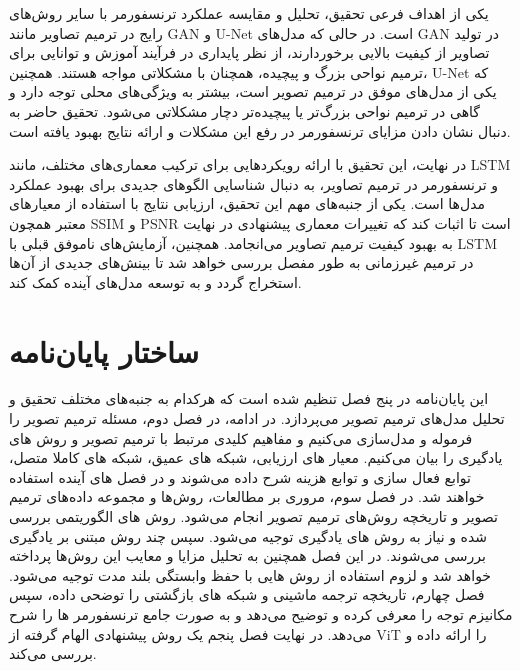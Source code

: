 یکی از اهداف فرعی تحقیق، تحلیل و مقایسه عملکرد ترنسفورمر با سایر روش‌های رایج در ترمیم تصاویر مانند GAN و U-Net است. در حالی که مدل‌های GAN در تولید تصاویر از کیفیت بالایی برخوردارند، از نظر پایداری در فرآیند آموزش و توانایی برای ترمیم نواحی بزرگ و پیچیده، همچنان با مشکلاتی مواجه هستند. همچنین، U-Net که یکی از مدل‌های موفق در ترمیم تصویر است، بیشتر به ویژگی‌های محلی توجه دارد و گاهی در ترمیم نواحی بزرگ‌تر یا پیچیده‌تر دچار مشکلاتی می‌شود. تحقیق حاضر به دنبال نشان دادن مزایای ترنسفورمر در رفع این مشکلات و ارائه نتایج بهبود یافته است.

در نهایت، این تحقیق با ارائه رویکردهایی برای ترکیب معماری‌های مختلف، مانند LSTM و ترنسفورمر در ترمیم تصاویر، به دنبال شناسایی الگوهای جدیدی برای بهبود عملکرد مدل‌ها است. یکی از جنبه‌های مهم این تحقیق، ارزیابی نتایج با استفاده از معیارهای معتبر همچون SSIM و PSNR است تا اثبات کند که تغییرات معماری پیشنهادی در نهایت به بهبود کیفیت ترمیم تصاویر می‌انجامد. همچنین، آزمایش‌های ناموفق قبلی با LSTM در ترمیم غیرزمانی به طور مفصل بررسی خواهد شد تا بینش‌های جدیدی از آن‌ها استخراج گردد و به توسعه مدل‌های آینده کمک کند.


\section{ساختار پایان‌نامه}

این پایان‌نامه در پنج فصل تنظیم شده است که هرکدام به جنبه‌های مختلف تحقیق و تحلیل مدل‌های ترمیم تصویر می‌پردازد. در ادامه، در فصل دوم، مسئله ترمیم تصویر را فرموله و مدل‌سازی می‌کنیم و مفاهیم کلیدی مرتبط با ترمیم تصویر و  روش های یادگیری را بیان می‌کنیم. معیار های ارزیابی، شبکه های عمیق، شبکه های کاملا متصل، توابع فعال سازی و توابع هزینه شرح داده می‌شوند و در فصل های آینده استفاده خواهند شد. در فصل سوم، مروری بر مطالعات، روش‌ها و مجموعه داده‌های%
ترمیم تصویر و تاریخچه روش‌های ترمیم تصویر انجام می‌شود. روش های الگوریتمی بررسی شده و نیاز به روش های یادگیری توجیه می‌شود. سپس چند روش مبتنی بر یادگیری بررسی می‌شوند. در این فصل همچنین به تحلیل مزایا و معایب این روش‌ها پرداخته خواهد شد و لزوم استفاده از روش هایی  با حفظ وابستگی بلند مدت توجیه می‌شود. فصل چهارم، تاریخچه ترجمه ماشینی و شبکه های بازگشتی را توضحی داده، سپس مکانیزم توجه را معرفی کرده و توضیح می‌دهد و به صورت جامع ترنسفورمر ها را شرح می‌دهد. در نهایت فصل پنجم یک روش پیشنهادی الهام گرفته از ViT را ارائه داده و بررسی می‌کند.
